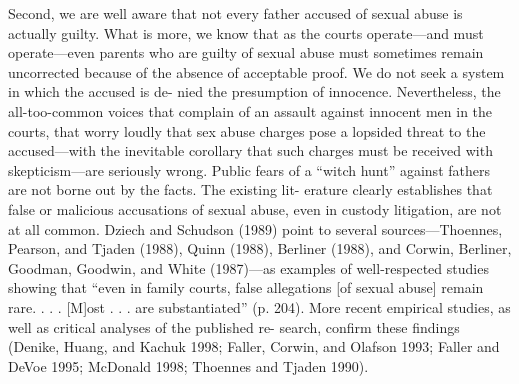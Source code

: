 Second, we are well aware that not every father accused of sexual
abuse is actually guilty. What is more, we know that as the courts
operate—and must operate—even parents who are guilty of sexual
abuse must sometimes remain uncorrected because of the absence of
acceptable proof. We do not seek a system in which the accused is de-
nied the presumption of innocence. Nevertheless, the all-too-common
voices that complain of an assault against innocent men in the courts,
that worry loudly that sex abuse charges pose a lopsided threat to
the accused—with the inevitable corollary that such charges must be
received with skepticism—are seriously wrong. Public fears of a “witch
hunt” against fathers are not borne out by the facts. The existing lit-
erature clearly establishes that false or malicious accusations of sexual
abuse, even in custody litigation, are not at all common. Dziech and
Schudson (1989) point to several sources—Thoennes, Pearson, and
Tjaden (1988), Quinn (1988), Berliner (1988), and Corwin, Berliner,
Goodman, Goodwin, and White (1987)—as examples of well-respected
studies showing that “even in family courts, false allegations [of sexual
abuse] remain rare. . . . [M]ost . . . are substantiated” (p. 204). More
recent empirical studies, as well as critical analyses of the published re-
search, confirm these findings (Denike, Huang, and Kachuk 1998; Faller,
Corwin, and Olafson 1993; Faller and DeVoe 1995; McDonald 1998;
Thoennes and Tjaden 1990). \pfl{}


